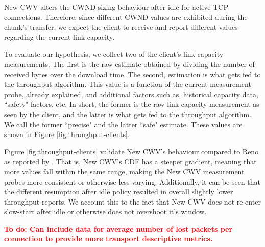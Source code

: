 \documentclass[10pt,sigconf]{acmart}
\newcommand{\todo}[1]{\textbf{\textcolor{red}{To do: #1}}}
\begin{document}
New CWV alters the CWND sizing behaviour after idle for active TCP connections. Therefore, since different CWND values are exhibited during the chunk's transfer, we expect the client to receive and report different values regarding the current link capacity. 

To evaluate our hypothesis, we collect two of the client's link capacity measurements. The first is the raw estimate obtained by dividing the number of received bytes over the download time. The second, estimation is what gets fed to the throughput algorithm. This value is a function of the current measurement probe, already explained, and additional factors such as, historical capacity data, ``safety" factors, etc. In short, the former is the raw link capacity measurement as seen by the client, and the latter is what gets fed to the throughput algorithm. We call the former ``precise" and the latter ``safe" estimate. These values are shown in Figure \ref{fig:throughput-clients}.

Figure \ref{fig:throughput-clients} validate New CWV's behaviour compared to Reno as reported by \cite{Nazir-2014-performance-evaluation-congestion-window-validation-dash-newcwv}. That is, New CWV's CDF has a steeper gradient, meaning that more values fall within the same range, making the New CWV measurement probes more consistent or otherwise less varying. Additionally, it can be seen that the different resumption after idle policy resulted in overall slightly lower throughput reports. We account this to the fact that New CWV does not re-enter slow-start after idle or otherwise does not overshoot it's window. 


\todo{Can include data for average number of lost packets per connection to provide more transport descriptive metrics.}
\end{document}
